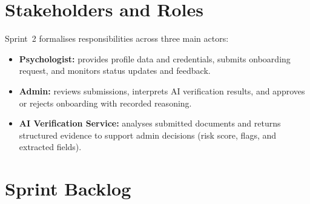 \section{Stakeholders and Roles}
\label{sec:sprint2-stakeholders}

Sprint~2 formalises responsibilities across three main actors:

\begin{itemize}
    \item \textbf{Psychologist:} provides profile data and credentials, submits
    onboarding request, and monitors status updates and feedback.
    \item \textbf{Admin:} reviews submissions, interprets AI verification
    results, and approves or rejects onboarding with recorded reasoning.
    \item \textbf{AI Verification Service:} analyses submitted documents and
    returns structured evidence to support admin decisions (risk score, flags,
    and extracted fields).
\end{itemize}

\section{Sprint Backlog}
\label{sec:sprint2-backlog}

\renewcommand{\arraystretch}{1.4}

